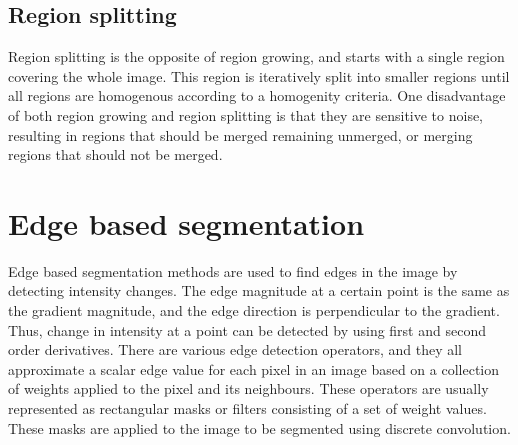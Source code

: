 \subsection{Region splitting}
Region splitting is the opposite of region growing, and starts with a single region covering the whole image. This region is iteratively split into smaller regions until all regions are homogenous according to a homogenity criteria. One disadvantage of both region growing and region splitting is that they are sensitive to noise, resulting in regions that should be merged remaining unmerged, or merging regions that should not be merged.

\section{Edge based segmentation}
Edge based segmentation methods are used to find edges in the image by detecting intensity changes. The edge magnitude at a certain point is the same as the gradient magnitude, and the edge direction is perpendicular to the gradient. Thus, change in intensity at a point can be detected by using first and second order derivatives. There are various edge detection operators, and they all approximate a scalar edge value for each pixel in an image based on a collection of weights applied to the pixel and its neighbours. These operators are usually represented as rectangular masks or filters consisting of a set of weight values. These masks are applied to the image to be segmented using discrete convolution. 

